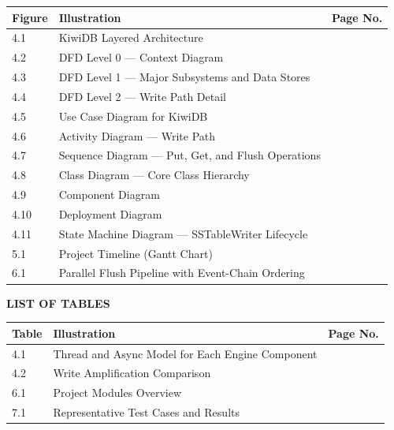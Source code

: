 \documentclass[oneside,a4paper,12pt]{book}
\begin{document}
\renewcommand{\arraystretch}{1.3}
\noindent
\begin{tabularx}{\textwidth}{|p{2cm}|X|p{1.5cm}|}
\hline
\textbf{Figure} & \textbf{Illustration} & \textbf{Page No.} \\
\hline
4.1 & KiwiDB Layered Architecture & \pageref{fig:arch} \\
\hline
4.2 & DFD Level 0 --- Context Diagram & \pageref{fig:dfd0} \\
\hline
4.3 & DFD Level 1 --- Major Subsystems and Data Stores & \pageref{fig:dfd1} \\
\hline
4.4 & DFD Level 2 --- Write Path Detail & \pageref{fig:dfd2} \\
\hline
4.5 & Use Case Diagram for KiwiDB & \pageref{fig:usecase} \\
\hline
4.6 & Activity Diagram --- Write Path & \pageref{fig:activity} \\
\hline
4.7 & Sequence Diagram --- Put, Get, and Flush Operations & \pageref{fig:sequence} \\
\hline
4.8 & Class Diagram --- Core Class Hierarchy & \pageref{fig:classdiag} \\
\hline
4.9 & Component Diagram & \pageref{fig:component} \\
\hline
4.10 & Deployment Diagram & \pageref{fig:deploy} \\
\hline
4.11 & State Machine Diagram --- SSTableWriter Lifecycle & \pageref{fig:statemachine} \\
\hline
5.1 & Project Timeline (Gantt Chart) & \pageref{fig:gantt} \\
\hline
6.1 & Parallel Flush Pipeline with Event-Chain Ordering & \pageref{fig:flush-pipeline} \\
\hline
\end{tabularx}

\newpage
\begin{center}
{\bfseries \fontsize{14}{17}\selectfont LIST OF TABLES}
\end{center}
\vspace*{2\baselineskip}

\renewcommand{\arraystretch}{1.3}
\noindent
\begin{tabularx}{\textwidth}{|p{2cm}|X|p{1.5cm}|}
\hline
\textbf{Table} & \textbf{Illustration} & \textbf{Page No.} \\
\hline
4.1 & Thread and Async Model for Each Engine Component & \pageref{tab:thread-model} \\
\hline
4.2 & Write Amplification Comparison & \pageref{tab:write-amp} \\
\hline
6.1 & Project Modules Overview & \pageref{tab:modules} \\
\hline
7.1 & Representative Test Cases and Results & \pageref{tab:testcases} \\
\hline
\end{tabularx}
\end{document}
